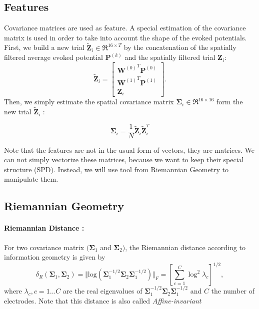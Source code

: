 \documentclass[11pt,a4paper]{article}
\begin{document}
\subsection{Features}
Covariance matrices are used as feature. A special estimation of the covariance matrix is used in order to take into account the shape of the evoked potentials. First, we build a new trial $\tilde{\mathbf{Z}}_i \in \Re^{16 \times T}$ by the concatenation of the spatially filtered average evoked potential $\mathbf{P}^{(k)}$ and the spatially filtered trial $\mathbf{Z}_i$: 
\begin{equation}
\tilde{\mathbf{Z}}_i =  \left[ 
\begin{array}{c}
{\mathbf{W}^{(0)}}^T \mathbf{P}^{(0)}\\ 
{\mathbf{W}^{(1)}}^T \mathbf{P}^{(1)} \\
\mathbf{Z}_i
\end{array} \right].
\end{equation}
Then, we simply estimate the spatial covariance matrix $\mathbf{\Sigma}_i \in \Re^{16 \times 16}$ form the new trial $\tilde{\mathbf{Z}}_i$ : 

\begin{equation}
\mathbf{\Sigma}_i  = \frac{1}{N} \tilde{\mathbf{Z}}_i \tilde{\mathbf{Z}}_i^T
\end{equation}

Note that the features are not in the usual form of vectors, they are matrices. We can not simply vectorize these matrices, because we want to keep their special structure (SPD). Instead, we will use tool from Riemannian Geometry to manipulate them.

\subsection{Riemannian Geometry}
\paragraph{Riemannian Distance :}
For two covariance matrix $(\mathbf{\Sigma}_1$ and $\mathbf{\Sigma}_2) $, the Riemannian distance according to information geometry is given by~\cite{moakher_differential_2005}
\begin{equation}
\label{eq:Rgeodistance}
\delta_R(\mathbf{\Sigma}_1,\mathbf{\Sigma}_2) 
= 
\Vert \mathrm{log} \left( \mathbf{\Sigma}_1^{-1/2} \mathbf{\Sigma}_2 \mathbf{\Sigma}_1^{-1/2} \right) \Vert_F
=
\left[ \sum_{c=1}^{C} \log^2 \lambda_c \right]^{1/2},
\end{equation}
where $\lambda_c, c=1\ldots C$ are the real eigenvalues 
of $\mathbf{\Sigma}_1^{-1/2} \mathbf{\Sigma}_2 \mathbf{\Sigma}_1^{-1/2}$ and $C$ the number of electrodes.
 Note that this distance is also called \emph{Affine-invariant}~\cite{arsigny2007geometric}
\end{document}
